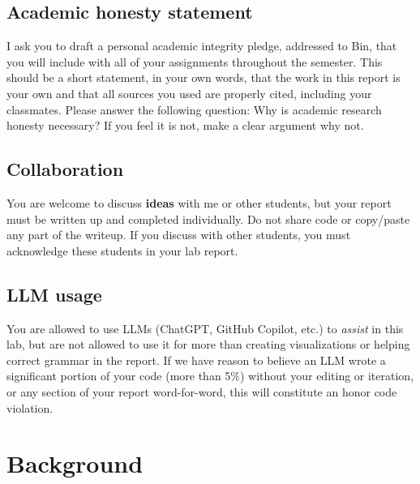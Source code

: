 \documentclass[10pt,letterpaper]{article}
\begin{document}
\subsection*{Academic honesty statement}

I ask you to draft a personal academic integrity pledge, addressed to Bin, that you will include with all of your assignments throughout the semester. This should be a short statement, in your own words, that the work in this report is your own and that all sources you used are properly cited, including your classmates. Please answer the following question: Why is academic research honesty necessary? If you feel it is not, make a clear argument why not.

\subsection*{Collaboration}

You are welcome to discuss \textbf{ideas} with me or other students, but your report must be written up and completed individually. Do not share code or copy/paste any part of the writeup. If you discuss with other students, you must acknowledge these students in your lab report.

\subsection*{LLM usage}

You are allowed to use LLMs (ChatGPT, GitHub Copilot, etc.) to \textit{assist} in this lab, but are not allowed to use it for more than creating visualizations or helping correct grammar in the report. If we have reason to believe an LLM wrote a significant portion of your code (more than 5\%) without your editing or iteration, or any section of your report word-for-word, this will constitute an honor code violation.

\section*{Background}
\end{document}
